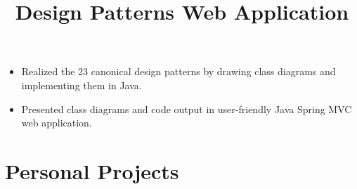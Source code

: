 \documentclass[12pt]{res} %
\begin{document}
\begin{resume}
          \title{\textbf{Design Patterns Web Application}}
          \begin{position}
            \vspace{-14pt}
            \begin{itemize}[leftmargin=-0.4cm, rightmargin=0.8cm]
            \itemsep0em
            \item Realized the 23 canonical design patterns by drawing class diagrams and implementing them in Java.
            \item Presented class diagrams and code output in user-friendly Java Spring MVC web application.
            \end{itemize}
          \end{position}
          \vspace{-10pt}


          
        \section{Personal Projects}

        \vspace{2pt}


\end{resume}
\end{document}
